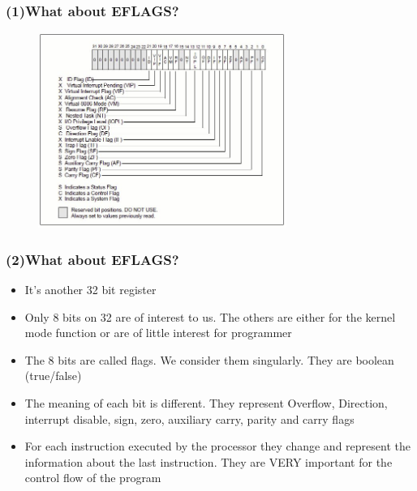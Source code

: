 \documentclass[]{beamer}
\begin{document}
		\begin{frame}
			\frametitle{(1)What about EFLAGS?}
			\begin{figure}
				\includegraphics[height=2.5in]{images/eflags.jpeg}
				\label{Eflags idea}
			\end{figure}
		\end{frame}
		\begin{frame}
			\frametitle{(2)What about EFLAGS?}
			\begin{itemize}
				\item{It's another 32 bit register}
				\item{Only 8 bits on 32 are of interest to us. The others are either for the kernel mode function or  are of little interest for programmer}
				\item{The 8 bits are called flags. We consider them singularly. They are boolean (true/false) }
				\item{The meaning of each bit is different. They represent Overflow, Direction, interrupt disable, sign, zero, auxiliary carry, parity and carry flags}
				\item{For each instruction executed by the processor they change and represent the information about the last instruction. They are VERY important for the control flow of the program }				
			\end{itemize}
		\end{frame}
\end{document}
